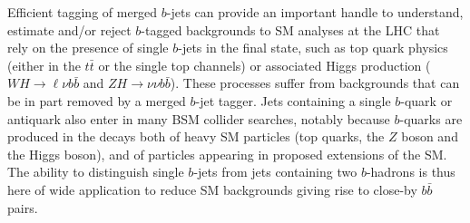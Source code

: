 
Efficient tagging of merged $b$-jets can provide an important handle to understand, estimate and/or reject $b$-tagged backgrounds to SM analyses at the LHC 
that rely on the presence of single $b$-jets in the final state, such as top quark physics (either in the $t\bar{t}$ or the single top channels) or associated Higgs production ($WH\rightarrow\ell\nu b\bar{b}$ and $ZH\rightarrow\nu\nu b\bar{b}$). These processes  suffer from backgrounds that can be in part removed by a merged $b$-jet tagger. 
Jets containing a single $b$-quark or antiquark
also enter in many BSM collider searches, notably because $b$-quarks are produced in the decays both of heavy SM particles (top quarks, the $Z$ boson and the Higgs boson), and of particles appearing in proposed extensions of the SM. The ability to distinguish single $b$-jets from jets containing two $b$-hadrons is thus here of wide application to reduce SM backgrounds giving rise to close-by $b\bar{b}$ pairs.

